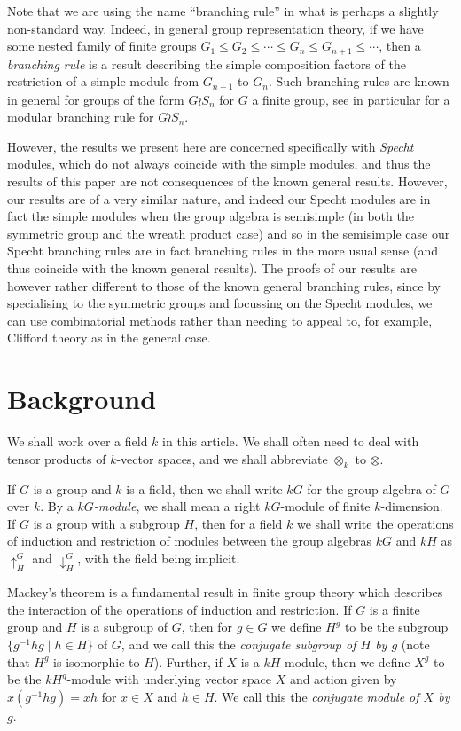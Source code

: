 Note that we are using the name ``branching rule'' in what is perhaps a slightly non-standard way. Indeed, in general group
representation theory, if we have some nested family of finite groups $G_1 \leq G_2 \leq \cdots \leq G_n \leq G_{n+1} \leq \cdots$, then a
\textit{branching rule} is a result describing the simple composition factors of the restriction of a simple module from $G_{n+1}$ to
$G_n$. Such branching rules are known in general for groups of the form $G \wr S_n$ for $G$ a finite group, see in particular
\cite{TSUWRBR} for a modular branching rule for $G \wr S_n$.

However, the results we present here are concerned specifically with \textit{Specht} modules, which do not always coincide with the simple
modules, and thus the results of this paper are not consequences of the known general results. However, our results are of a very similar
nature, and indeed our Specht modules are in fact the simple modules when the group algebra is semisimple (in both the symmetric group
and the wreath product case) and so in the semisimple case our Specht branching rules are in fact branching rules in the more usual
sense (and thus coincide with the known general results). The proofs of our results are however rather different to those of the known
general branching rules, since by specialising to the symmetric groups and focussing on the Specht modules, we can use combinatorial
methods rather than needing to appeal to, for example, Clifford theory as in the general case.


\section{Background}
We shall work over a field $k$ in this article. We shall often need to deal with tensor products of $k$-vector spaces, and we shall
abbreviate $\otimes_k$ to $\otimes$.

If $G$ is a group and $k$ is a field, then we shall write $kG$ for the group algebra of $G$ over $k$. By a \textit{$kG$-module}, we shall
mean a right $kG$-module of finite $k$-dimension.
If $G$ is a group with a subgroup $H$, then for a field $k$ we shall write the operations of induction and restriction of modules
between the group algebras $kG$ and $kH$ as $\uparrow^{G}_{H}$ and $\downarrow^{G}_{H}$, with the field being implicit.

Mackey's theorem is a fundamental result in finite group theory which describes the interaction of the operations of induction and
restriction. If $G$ is a finite group and $H$ is a subgroup of $G$, then for $g \in G$ we define $H^g$ to be the subgroup
$\{g^{-1}hg \mid h \in H\}$ of $G$, and we call this the \textit{conjugate subgroup of $H$ by $g$} (note that $H^g$ is isomorphic to $H$).
Further, if $X$ is a $kH$-module, then we define $X^g$ to be the $kH^g$-module with underlying vector space $X$ and action given by
$x(g^{-1}hg) = xh$ for $x \in X$ and $h \in H$. We call this the \textit{conjugate module of $X$ by $g$}.

